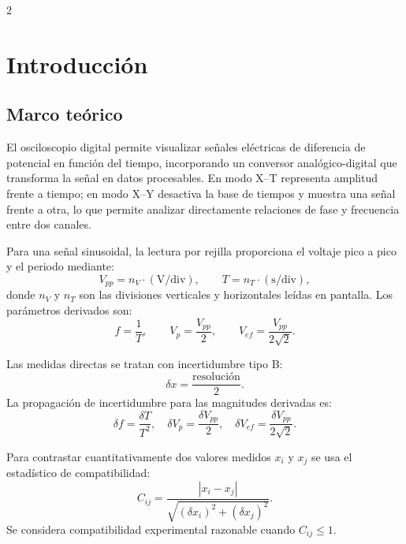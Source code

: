 \documentclass[12pt,a4paper]{article}
\begin{document}
\begin{multicols}{2}

\section{Introducción}

\subsection{Marco teórico}

El osciloscopio digital permite visualizar señales eléctricas de diferencia de potencial en función del tiempo, incorporando un conversor analógico-digital que transforma la señal en datos procesables. En modo X--T representa amplitud frente a tiempo; en modo X--Y desactiva la base de tiempos y muestra una señal frente a otra, lo que permite analizar directamente relaciones de fase y frecuencia entre dos canales.

Para una señal sinusoidal, la lectura por rejilla proporciona el voltaje pico a pico y el periodo mediante:
\begin{equation}
V_{pp} = n_V \cdot (\text{V/div}), \qquad T = n_T \cdot (\text{s/div}),
\label{eq:rejilla}
\end{equation}
donde $n_V$ y $n_T$ son las divisiones verticales y horizontales leídas en pantalla. Los parámetros derivados son:
\begin{equation}
f = \frac{1}{T}, \qquad V_p = \frac{V_{pp}}{2}, \qquad V_{ef} = \frac{V_{pp}}{2\sqrt{2}}.
\label{eq:derivadas}
\end{equation}

Las medidas directas se tratan con incertidumbre tipo B:
\begin{equation}
\delta x = \frac{\text{resolución}}{2}.
\label{eq:tipoB}
\end{equation}
La propagación de incertidumbre para las magnitudes derivadas es:
\begin{equation}
\delta f = \frac{\delta T}{T^{2}}, \quad \delta V_p = \frac{\delta V_{pp}}{2}, \quad \delta V_{ef} = \frac{\delta V_{pp}}{2\sqrt{2}}.
\label{eq:propagacion}
\end{equation}

Para contrastar cuantitativamente dos valores medidos $x_i$ y $x_j$ se usa el estadístico de compatibilidad:
\begin{equation}
C_{ij} = \frac{|x_i - x_j|}{\sqrt{(\delta x_i)^2 + (\delta x_j)^2}}.
\label{eq:compat}
\end{equation}
Se considera compatibilidad experimental razonable cuando $C_{ij} \leq 1$.


\end{multicols}
\end{document}
